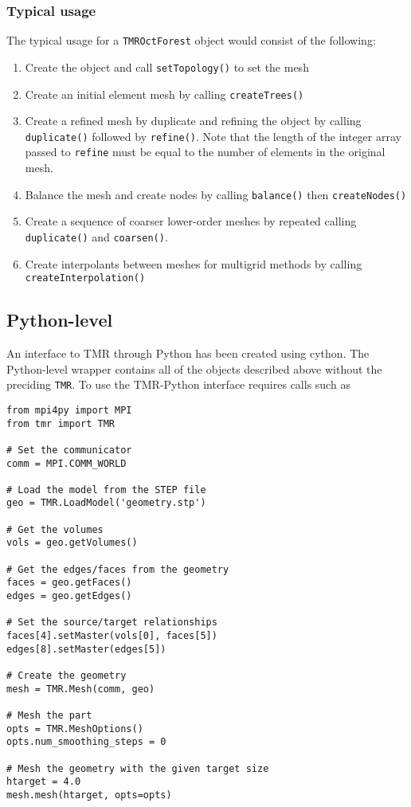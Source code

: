 \documentclass[12pt]{article}
\begin{document}
\subsubsection{Typical usage}

The typical usage for a \texttt{TMROctForest} object would consist of the following:
\begin{enumerate}
\item Create the object and call \texttt{setTopology()} to set the mesh
\item Create an initial element mesh by calling \texttt{createTrees()}
\item Create a refined mesh by duplicate and refining the object by calling \texttt{duplicate()} followed by \texttt{refine()}. Note that the length of the integer array passed to \texttt{refine} must be equal to the number of elements in the original mesh.
\item Balance the mesh and create nodes by calling \texttt{balance()} then \texttt{createNodes()}
\item Create a sequence of coarser lower-order meshes by repeated calling \texttt{duplicate()} and \texttt{coarsen()}.
\item Create interpolants between meshes for multigrid methods by calling \texttt{createInterpolation()}
\end{enumerate}


\subsection{Python-level}

An interface to TMR through Python has been created using cython.
The Python-level wrapper contains all of the objects described above without the preciding \texttt{TMR}. 
To use the TMR-Python interface requires calls such as
\begin{verbatim}
from mpi4py import MPI
from tmr import TMR

# Set the communicator
comm = MPI.COMM_WORLD

# Load the model from the STEP file
geo = TMR.LoadModel('geometry.stp')

# Get the volumes
vols = geo.getVolumes()

# Get the edges/faces from the geometry
faces = geo.getFaces()
edges = geo.getEdges()

# Set the source/target relationships
faces[4].setMaster(vols[0], faces[5])
edges[8].setMaster(edges[5])

# Create the geometry
mesh = TMR.Mesh(comm, geo)

# Mesh the part
opts = TMR.MeshOptions()
opts.num_smoothing_steps = 0

# Mesh the geometry with the given target size
htarget = 4.0
mesh.mesh(htarget, opts=opts)
\end{verbatim}
\end{document}
